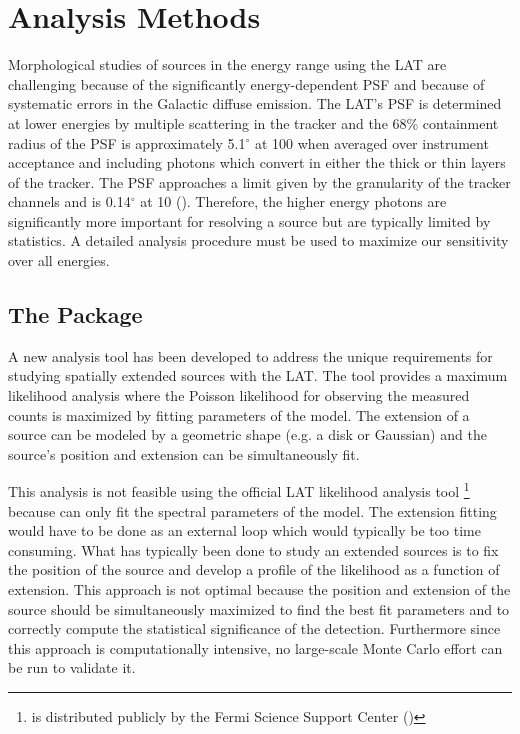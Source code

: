 \documentclass[12pt,preprint]{aastex}
\newcommand{\mev}{\text{MeV}\xspace}
\newcommand{\gev}{\text{GeV}\xspace}
\renewcommand{\deg}{\ensuremath{^\circ}\xspace}
\newcommand{\pointlike}{\text{\em pointlike}\xspace}
\newcommand{\gtlike}{\text{\em gtlike}\xspace}
\begin{document}
\section{Analysis Methods}

Morphological studies of sources in the \gev energy range
using the LAT are challenging because of the significantly 
energy-dependent PSF and because of systematic errors in the Galactic diffuse
emission.  The LAT's PSF is determined at lower energies by multiple
scattering in the tracker and the 68\% containment radius of the PSF is
approximately 5.1\deg at 100 \mev  when averaged over instrument acceptance
and including photons which convert in either the thick or thin layers of
the tracker. The PSF approaches a limit given by the granularity of the
tracker channels and is 0.14\deg at 10 \gev (\cite{on_orbit_calibration}).
Therefore, the higher energy photons are significantly more important for
resolving a source but are typically limited by statistics. 
A detailed analysis procedure must be used to maximize our
sensitivity over all energies.

\subsection{The \pointlike Package}

A new analysis tool has been developed to address the unique requirements
for studying spatially extended sources with the LAT. The tool
provides a maximum likelihood analysis where the Poisson likelihood
for observing the measured counts is maximized by fitting
parameters of the model.  The extension of a source can be modeled by a
geometric shape (e.g. a disk or Gaussian) and the source's position
and extension can be simultaneously fit.

This analysis is not feasible using the official LAT likelihood
analysis tool \gtlike\footnote{\gtlike is distributed publicly by the
Fermi Science Support Center (\cite{fssc})} because \gtlike can only 
fit the spectral parameters of the model. The extension fitting would
have to be done as an external loop which would typically be
too time consuming. What has typically
been done to study an extended sources is to fix the position of the
source and develop a profile of the likelihood as a
function of extension.  This approach is not optimal because the
position and extension of the source should be simultaneously maximized
to find the best fit parameters and to correctly compute the statistical
significance of the detection.  Furthermore since this approach is
computationally intensive, no large-scale Monte Carlo effort can
be run to validate it.
\end{document}
